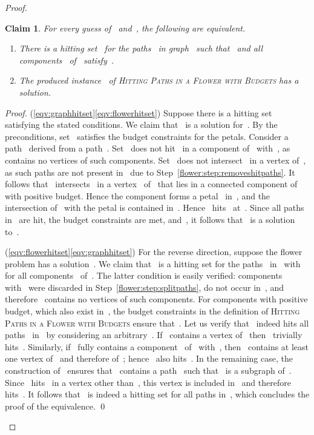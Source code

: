 \let\accentvec\vec  \documentclass{llncs}
\newtheorem{numberedclaim}{Claim}
\newcommand{\claimqed}{\renewcommand{\squareforqed}{}\qed\renewcommand{\squareforqed}{\plainsquareforqed}}
\newcommand{\HitPathsInFlower}{\textsc{Hitting Paths in a Flower with Budgets}\xspace}
\begin{document}
\begin{proof}
\begin{numberedclaim}
For every guess of~ and~, the following are equivalent. 
\begin{enumerate}
	\item There is a hitting set~ for the paths~ in graph~ such that~ and all components~ of~ satisfy~.\label{eqv:graphhitset}
	\item The produced instance~ of \HitPathsInFlower has a solution.\label{eqv:flowerhitset}
\end{enumerate}
\end{numberedclaim}
\begin{proof}
(\ref{eqv:graphhitset}\ref{eqv:flowerhitset}) Suppose there is a hitting set~ satisfying the stated conditions. We claim that~ is a solution for~. By the preconditions, set~ satisfies the budget constraints for the petals. Consider a path~ derived from a path~. Set~ does not hit~ in a component of~ with~, as~ contains no vertices of such components. Set~ does not intersect~ in a vertex of~, as such paths are not present in~ due to Step~\ref{flower:step:removeshitpaths}. It follows that~ intersects~ in a vertex~ of~ that lies in a connected component of~ with positive budget. Hence the component forms a petal~ in~, and the intersection of~ with the petal is contained in~. Hence~ hits~ at~. Since all paths in~ are hit, the budget constraints are met, and~, it follows that~ is a solution to~.

(\ref{eqv:flowerhitset}\ref{eqv:graphhitset}) For the reverse direction, suppose the flower problem has a solution~. We claim that~ is a hitting set for the paths~ in~ with~ for all components~ of~. The latter condition is easily verified: components~ with~ were discarded in Step~\ref{flower:step:splitpaths}, do not occur in~, and therefore~ contains no vertices of such components. For components with positive budget, which also exist in~, the budget constraints in the definition of \HitPathsInFlower ensure that~. Let us verify that~ indeed hits all paths~ in~ by considering an arbitrary~. If~ contains a vertex of~ then~ trivially hits~. Similarly, if~ fully contains a component~ of~ with~, then~ contains at least one vertex of~ and therefore of~; hence~ also hits~. In the remaining case, the construction of~ ensures that~ contains a path~ such that~ is a subgraph of~. Since~ hits~ in a vertex other than~, this vertex is included in~ and therefore~ hits~. It follows that~ is indeed a hitting set for all paths in~, which concludes the proof of the equivalence.
\claimqed
\end{proof}


\end{proof}
\end{document}
